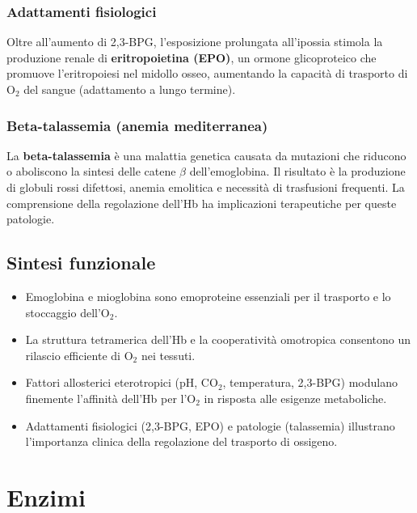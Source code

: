 \documentclass[12pt,a4paper]{report}
\begin{document}
\subsection{Adattamenti fisiologici}
Oltre all'aumento di 2,3-BPG, l'esposizione prolungata all'ipossia stimola la produzione renale di \textbf{eritropoietina (EPO)}, un ormone glicoproteico che promuove l'eritropoiesi nel midollo osseo, aumentando la capacità di trasporto di \(\mathrm{O_2}\) del sangue (adattamento a lungo termine).

\subsection{Beta-talassemia (anemia mediterranea)}
La \textbf{beta-talassemia} è una malattia genetica causata da mutazioni che riducono o aboliscono la sintesi delle catene \(\beta\) dell'emoglobina. Il risultato è la produzione di globuli rossi difettosi, anemia emolitica e necessità di trasfusioni frequenti. La comprensione della regolazione dell'Hb ha implicazioni terapeutiche per queste patologie.

\section{Sintesi funzionale}
\begin{itemize}
\item Emoglobina e mioglobina sono emoproteine essenziali per il trasporto e lo stoccaggio dell'\(\mathrm{O_2}\).
\item La struttura tetramerica dell'Hb e la cooperatività omotropica consentono un rilascio efficiente di \(\mathrm{O_2}\) nei tessuti.
\item Fattori allosterici eterotropici (pH, \(\mathrm{CO_2}\), temperatura, 2,3-BPG) modulano finemente l'affinità dell'Hb per l'\(\mathrm{O_2}\) in risposta alle esigenze metaboliche.
\item Adattamenti fisiologici (2,3-BPG, EPO) e patologie (talassemia) illustrano l'importanza clinica della regolazione del trasporto di ossigeno.
\end{itemize}

\chapter{Enzimi}
\end{document}

